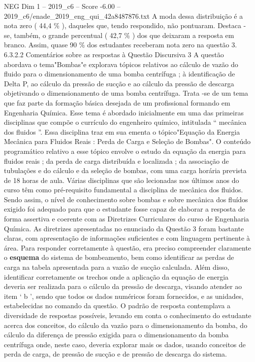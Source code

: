 \begin{textsample}{NEG Dim 1 – 2019\_c6 – Score -6.00 – 2019\_c6/enade\_2019\_eng\_qui\_42a8487876.txt}
A moda dessa distribuição é a nota zero ( 44,4 \% ), daqueles que, tendo respondido, não pontuaram.
Destaca -se, também, o grande percentual ( 42,7 \% ) dos que deixaram a resposta em branco.
Assim, quase 90 \% dos estudantes receberam nota zero na questão 3. 6.3.2.2 Comentários sobre as respostas à Questão Discursiva 3 A questão abordava o tema"Bombas"e explorava tópicos relativos ao cálculo de vazão do fluido para o dimensionamento de uma bomba centrífuga ; à identificação de Delta P, ao cálculo da pressão de sucção e ao cálculo da pressão de descarga objetivando o dimensionamento de uma bomba centrífuga.
Trata -se de um tema que faz parte da formação básica desejada de um profissional formando em Engenharia Química.
Esse tema é abordado inicialmente em uma das primeiras disciplinas que compõe o currículo do engenheiro químico, intitulada “ mecânica dos fluidos ”.
Essa disciplina traz em sua ementa o tópico"Equação da Energia Mecânica para Fluidos Reais : Perda de Carga e Seleção de Bombas".
O conteúdo programático relativo a esse tópico envolve o estudo da equação da energia para fluidos reais ; da perda de carga distribuída e localizada ; da associação de tubulações e do cálculo e da seleção de bombas, com uma carga horária prevista de 18 horas de aula.
Várias disciplinas que são lecionadas nos últimos anos do curso têm como pré-requisito fundamental a disciplina de mecânica dos fluidos.
Sendo assim, o nível de conhecimento sobre bombas e sobre mecânica dos fluídos exigido foi adequado para que o estudante fosse capaz de elaborar a resposta de forma assertiva e coerente com as Diretrizes Curriculares do curso de Engenharia Química.
As diretrizes apresentadas no enunciado da Questão 3 foram bastante claras, com apresentação de informações suficientes e com linguagem pertinente à área.
Para responder corretamente à questão, era preciso compreender claramente o \textbf{esquema} do sistema de bombeamento, bem como identificar as perdas de carga na tabela apresentada para a vazão de sucção calculada.
Além disso, identificar corretamente os trechos onde a aplicação da equação de energia deveria ser realizada para o cálculo da pressão de descarga, visando atender ao item ‘ b ’, sendo que todos os dados numéricos foram fornecidos, e as unidades, estabelecidas no comando da questão.
O padrão de resposta contemplava a diversidade de respostas possíveis, levando em conta o conhecimento do estudante acerca dos conceitos, do cálculo da vazão para o dimensionamento da bomba, do cálculo da diferença de pressão exigida para o dimensionamento da bomba centrífuga onde, neste caso, deveria explorar mais os dados, usando conceitos de perda de carga, de pressão de sucção e de pressão de descarga do sistema.

\end{textsample}

